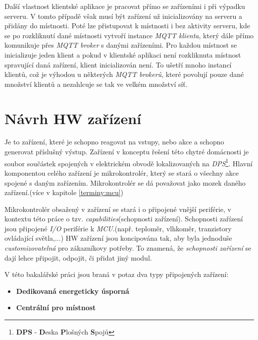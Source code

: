 Další vlastnost klientské aplikace je pracovat přímo se zařízeními i při výpadku serveru.
V tomto případě však musí být zařízení už inicializovány na serveru a přidány do místnosti.
Poté lze přistupovat k místnosti i bez aktivity serveru, kde se po rozkliknutí dané místnosti vytvoří instance \emph{MQTT klienta}, který dále přímo komunikuje přes \emph{MQTT broker} s danými zařízeními.
Pro každou místnost se inicializuje jeden klient a pokud v klientské aplikaci není rozkliknuta místnost spravující daná zařízení, klient inicializován není.
To ušetří mnoho instancí klientů, což je výhodou u některých \emph{MQTT brokerů}, které povolují pouze dané množství klientů a nezahlcuje se tak ve velkém množství síť.

\section{Návrh HW zařízení}
\label{navrh:hardware}

Je to zařízení, které je schopno reagovat na vstupy, nebo akce a schopno generovat příslušný výstup.
Zařízení v konceptu řešení této chytré domácnosti je soubor součástek spojených v elektrickém obvodě lokalizovaných na \emph{DPS}\footnote{\textbf{DPS} - \textbf{D}eska \textbf{P}lošných \textbf{S}pojů}.
Hlavní komponentou celého zařízení je mikrokontrolér, který se stará o všechny akce spojené s daným zařízením.
Mikrokontrolér se dá považovat jako mozek daného zařízení.(více v kapitole \ref{terminy:mcu})

Mikrokontrolér obsažený v zařízení se stará i o připojené vnější periférie, v kontextu této práce o tzv. \emph{capabilities}(schopnosti zařízení).
Schopnosti zařízení jsou připojené \emph{I/O} periférie k \emph{MCU}.(např. teploměr, vlhkoměr, tranzistory ovládající světla,...)
HW zařízení jsou koncipována tak, aby byla jednoduše \emph{customizovatelná} pro zákazníkovy potřeby.
To znamená, že \emph{schopnosti zařízení} se dají lehce připojit, odpojit, či přidat jiný modul.
\newline

V této bakalářské práci jsou braná v potaz dva typy připojených zařízení:
\begin{itemize}
  \item \textbf{Dedikovaná energeticky úsporná}
  \item \textbf{Centrální pro místnost}
\end{itemize}

